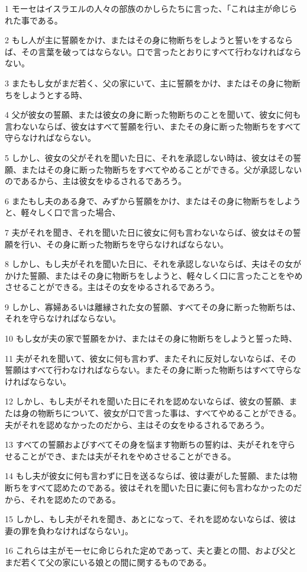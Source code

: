 \par 1 モーセはイスラエルの人々の部族のかしらたちに言った、「これは主が命じられた事である。
\par 2 もし人が主に誓願をかけ、またはその身に物断ちをしようと誓いをするならば、その言葉を破ってはならない。口で言ったとおりにすべて行わなければならない。
\par 3 またもし女がまだ若く、父の家にいて、主に誓願をかけ、またはその身に物断ちをしようとする時、
\par 4 父が彼女の誓願、または彼女の身に断った物断ちのことを聞いて、彼女に何も言わないならば、彼女はすべて誓願を行い、またその身に断った物断ちをすべて守らなければならない。
\par 5 しかし、彼女の父がそれを聞いた日に、それを承認しない時は、彼女はその誓願、またはその身に断った物断ちをすべてやめることができる。父が承認しないのであるから、主は彼女をゆるされるであろう。
\par 6 またもし夫のある身で、みずから誓願をかけ、またはその身に物断ちをしようと、軽々しく口で言った場合、
\par 7 夫がそれを聞き、それを聞いた日に彼女に何も言わないならば、彼女はその誓願を行い、その身に断った物断ちを守らなければならない。
\par 8 しかし、もし夫がそれを聞いた日に、それを承認しないならば、夫はその女がかけた誓願、またはその身に物断ちをしようと、軽々しく口に言ったことをやめさせることができる。主はその女をゆるされるであろう。
\par 9 しかし、寡婦あるいは離縁された女の誓願、すべてその身に断った物断ちは、それを守らなければならない。
\par 10 もし女が夫の家で誓願をかけ、またはその身に物断ちをしようと誓った時、
\par 11 夫がそれを聞いて、彼女に何も言わず、またそれに反対しないならば、その誓願はすべて行わなければならない。またその身に断った物断ちはすべて守らなければならない。
\par 12 しかし、もし夫がそれを聞いた日にそれを認めないならば、彼女の誓願、または身の物断ちについて、彼女が口で言った事は、すべてやめることができる。夫がそれを認めなかったのだから、主はその女をゆるされるであろう。
\par 13 すべての誓願およびすべてその身を悩ます物断ちの誓約は、夫がそれを守らせることができ、または夫がそれをやめさせることができる。
\par 14 もし夫が彼女に何も言わずに日を送るならば、彼は妻がした誓願、または物断ちをすべて認めたのである。彼はそれを聞いた日に妻に何も言わなかったのだから、それを認めたのである。
\par 15 しかし、もし夫がそれを聞き、あとになって、それを認めないならば、彼は妻の罪を負わなければならない」。
\par 16 これらは主がモーセに命じられた定めであって、夫と妻との間、および父とまだ若くて父の家にいる娘との間に関するものである。

